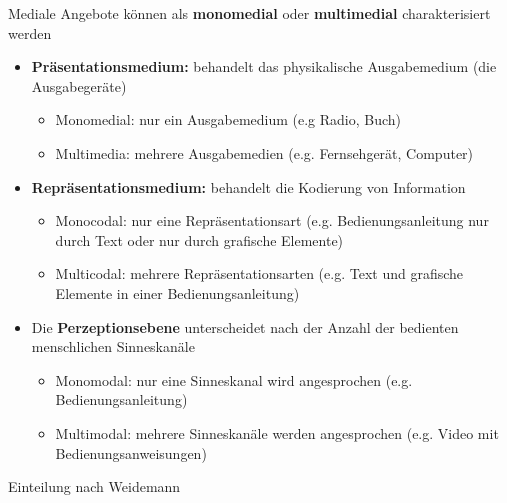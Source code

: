   
  \begin{bsslide}
    \small
    Mediale Angebote k\"onnen als \textbf{monomedial} oder \textbf{multimedial} charakterisiert werden
    \begin{itemize}
      \item \textbf{Pr\"asentationsmedium:} behandelt das physikalische Ausgabemedium (die Ausgabeger\"ate)
      \begin{itemize}
        \item Monomedial: nur ein Ausgabemedium (e.g Radio, Buch)
        \item Multimedia: mehrere Ausgabemedien (e.g. Fernsehger\"at, Computer)
      \end{itemize}
      \item \textbf{Repr\"asentationsmedium:} behandelt die Kodierung von Information
      \begin{itemize}
        \item Monocodal: nur eine Repr\"asentationsart (e.g. Bedienungsanleitung nur durch Text oder nur durch grafische Elemente)
        \item Multicodal: mehrere Repr\"asentationsarten (e.g. Text und grafische Elemente in einer Bedienungsanleitung)
      \end{itemize}
      \item Die \textbf{Perzeptionsebene} unterscheidet nach der Anzahl der bedienten menschlichen Sinneskan\"ale
      \begin{itemize}
        \item Monomodal: nur eine Sinneskanal wird angesprochen (e.g. Bedienungsanleitung)
        \item Multimodal: mehrere Sinneskan\"ale werden angesprochen (e.g. Video mit Bedienungsanweisungen)
      \end{itemize}
    \end{itemize}
    \small Einteilung nach Weidemann
  \end{bsslide}
  

